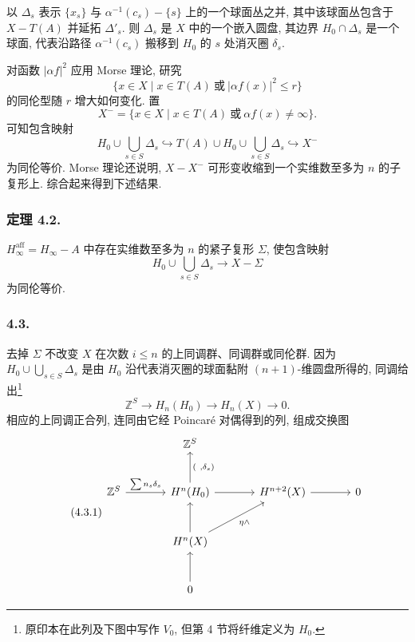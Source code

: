以 $\Delta_s$ 表示 $\{x_s\}$ 与 $\alpha^{-1}(c_s)-\{s\}$ 上的一个球面丛之并, 其中该球面丛包含于 $X-T(A)$ 并延拓 $\Delta'_s$. 则 $\Delta_s$ 是 $X$ 中的一个嵌入圆盘, 其边界 $H_0\cap\Delta_s$ 是一个球面, 代表沿路径 $\alpha^{-1}(c_s)$ 搬移到 $H_0$ 的 $s$ 处消灭圈 $\delta_s$.

对函数 $|\alpha f|^2$ 应用 Morse 理论, 研究
\[
 \{x\in X\mid x\in T(A)\ \text{或}\ |\alpha f(x)|^2\leq r\}
\]
的同伦型随 $r$ 增大如何变化. 置
\[
 X^- = \{x\in X\mid x\in T(A)\ \text{或}\ \alpha f(x)\ne\infty\}.
\]
可知包含映射
\[
 H_0\cup\bigcup_{s\in S}\Delta_s
 \hookrightarrow
 T(A)\cup H_0\cup\bigcup_{s\in S}\Delta_s
 \hookrightarrow X^-
\]
为同伦等价. Morse 理论还说明, $X-X^-$ 可形变收缩到一个实维数至多为 $n$ 的子复形上. 综合起来得到下述结果.

\subsubsection*{定理 4.2.}
$H_\infty^{\mathrm{aff}}=H_\infty-A$ 中存在实维数至多为 $n$ 的紧子复形 $\Sigma$, 使包含映射
\[
 H_0\cup\bigcup_{s\in S}\Delta_s\longrightarrow X-\Sigma
\]
为同伦等价.

\subsubsection*{4.3.}
去掉 $\Sigma$ 不改变 $X$ 在次数 $i\leq n$ 的上同调群、同调群或同伦群. 因为 $H_0\cup\bigcup_{s\in S}\Delta_s$ 是由 $H_0$ 沿代表消灭圈的球面黏附 $(n+1)$-维圆盘所得的, 同调给出\footnote{原印本在此列及下图中写作 $V_0$, 但第 4 节将纤维定义为 $H_0$.}
\[
 \mathbb Z^S\longrightarrow H_n(H_0)\longrightarrow H_n(X)
 \longrightarrow0.
\]
相应的上同调正合列, 连同由它经 Poincar\'e 对偶得到的列, 组成交换图
\begin{equation}\tag{4.3.1}
\begin{tikzcd}[row sep=large,column sep=large]
{} & \mathbb Z^S & {} & {} \\
\mathbb Z^S \arrow[r,"{\sum n_s\delta_s}"] &
H^n(H_0) \arrow[u,"{(\ ,\delta_s)}"'] \arrow[r] &
H^{n+2}(X) \arrow[r] & 0 \\
{} & H^n(X) \arrow[u] \arrow[ur,"{\eta\wedge}"'] & {} & {} \\
{} & 0 \arrow[u] & {} & {}
\end{tikzcd}
\end{equation}
